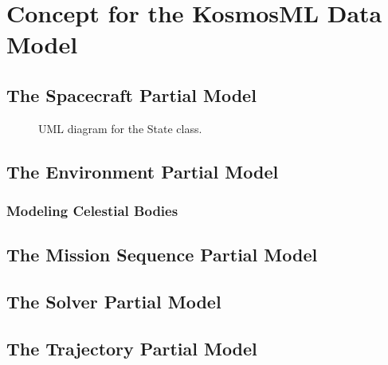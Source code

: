 \chapter{Concept for the KosmosML Data Model}
\label{sec:concept}

\section{The Spacecraft Partial Model}
\begin{figure}[ht]
    \centering
    \caption{UML diagram for the State class.}
    \label{fig:stateuml}
\end{figure}

\section{The Environment Partial Model}

\subsection{Modeling Celestial Bodies}



\section{The Mission Sequence Partial Model}

\section{The Solver Partial Model}

\section{The Trajectory Partial Model}
